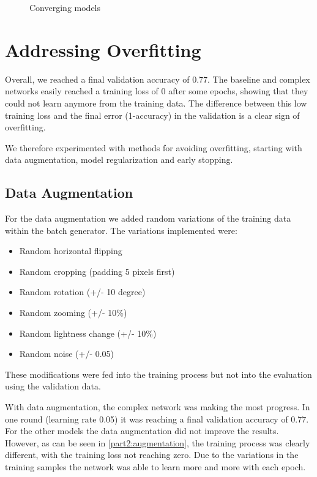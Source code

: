 \documentclass[sigconf,nonacm]{acmart}
\begin{document}
\begin{figure}[ht]
\begin{subfigure}[c]{0.45\columnwidth}
\end{subfigure}
\vspace{-.7\baselineskip}
\caption{Converging models}
\label{part2:converging}
\end{figure}

\section{Addressing Overfitting}

Overall, we reached a final validation accuracy of 0.77.
The baseline and complex networks easily reached a
training loss of 0 after some epochs, showing that
they could not learn anymore from the training data.
The difference between this low training loss and
the final error (1-accuracy) in the validation
is a clear sign of overfitting.

We therefore experimented with methods for avoiding
overfitting, starting with data augmentation,
model regularization and early stopping.

\subsection{Data Augmentation}

For the data augmentation we added random variations of
the training data within the batch generator.
The variations implemented were:
\begin{itemize}
\item Random horizontal flipping
\item Random cropping (padding 5 pixels first)
\item Random rotation (+/- 10 degree)
\item Random zooming (+/- 10\%)
\item Random lightness change (+/- 10\%)
\item Random noise (+/- 0.05)
\end{itemize}

These modifications were fed into the training process
but not into the evaluation using the validation data.

With data augmentation, the complex network was making the
most progress. In one round (learning rate 0.05) it was
reaching a final validation accuracy of 0.77.
For the other models the data augmentation did
not improve the results.
However, as can be seen in \ref{part2:augmentation},
the training process was clearly different,
with the training loss not reaching zero.
Due to the variations in the training samples
the network was able to learn
more and more with each epoch.
\end{document}

